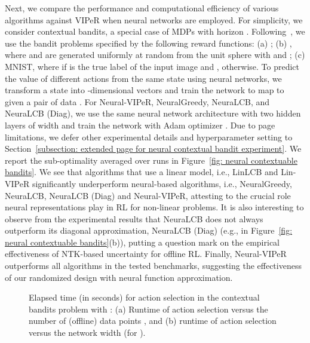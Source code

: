 \documentclass{article} \usepackage{iclr2023/iclr2023_conference,times}
\begin{document}
Next, we compare the performance and computational efficiency of various algorithms against VIPeR when neural networks are employed. For simplicity, we consider contextual bandits, a special case of MDPs with horizon . 
Following~\cite{zhou2020neural, nguyen2021offline}, we use the bandit problems specified by the following reward functions: (a) ; (b) , where  and  are generated uniformly at random from the unit sphere  with  and ; (c) MNIST, where  if  is the true label of the input image  and , otherwise. To predict the value of different actions from the same state  using neural networks, we transform a state  into -dimensional vectors  and train the network to map  to  given a pair of data . For Neural-VIPeR, NeuralGreedy, NeuraLCB, and NeuraLCB (Diag), we use the same neural network architecture with two hidden layers of width  and train the network with Adam optimizer \citep{kingma2014adam}. Due to page limitations, we defer other experimental details and hyperparameter setting to Section~\ref{subsection: extended page for neural contextual bandit experiment}. We report the sub-optimality averaged over  runs in Figure~\ref{fig: neural contextuable bandits}. We see that algorithms that use a linear model, i.e., LinLCB and Lin-VIPeR significantly underperform neural-based algorithms, i.e., NeuralGreedy, NeuraLCB, NeuraLCB (Diag) and Neural-VIPeR, attesting to the crucial role neural representations play in RL for non-linear problems. It is also interesting to observe from the experimental results that NeuraLCB does not always outperform its diagonal approximation, NeuraLCB (Diag) (e.g., in Figure~\ref{fig: neural contextuable bandits}(b)), putting a question mark on the empirical effectiveness of NTK-based uncertainty for offline RL. Finally, Neural-VIPeR outperforms all algorithms in the tested benchmarks, suggesting the effectiveness of our randomized design with neural function approximation. 





\begin{figure}[h]
    \vspace{-10pt}
    \centering
    \vspace{-10pt}
    \caption{Elapsed time (in seconds) for action selection in the contextual bandits problem with : (a) Runtime of action selection versus the number of (offline) data points , and (b) runtime of action selection versus the network width  (for ).}
    \label{fig: time for action selection}
    \vspace{-8pt}
\end{figure}
\end{document}
